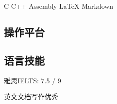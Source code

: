 \documentclass[12pt,a4paper]{resume}
\begin{document}
\begin{minipage}[t]{0.32\textwidth}
\subtitle{其他熟悉语言：}
C \textbullet{} C++ \textbullet{} Assembly \textbullet{} \LaTeX \textbullet{} Markdown \\
\sectionsep

\subsection{操作平台}
\subtitle{Mac OSX, Linux, Windows}
\sectionsep

\subsection{语言技能}
\subtitle{英语：}
\begin{lists}
\item 雅思IELTS: 7.5 / 9
\item 英文文档写作优秀
\end{lists}
\sectionsep



%
%
\end{minipage} 
\hfill
\end{document}
